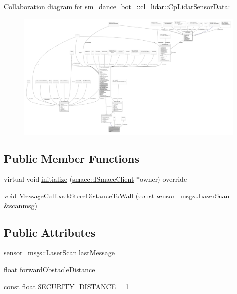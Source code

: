 Collaboration diagram for sm\+\_\+dance\+\_\+bot\+\_\+:\+:cl\+\_\+lidar\+:\+:Cp\+Lidar\+Sensor\+Data\+:
\nopagebreak
\begin{figure}[H]
\begin{center}
\leavevmode
\includegraphics[width=350pt]{classsm__dance__bot__2_1_1cl__lidar_1_1CpLidarSensorData__coll__graph}
\end{center}
\end{figure}
\subsection*{Public Member Functions}
\begin{DoxyCompactItemize}
\item 
virtual void \hyperlink{classsm__dance__bot__2_1_1cl__lidar_1_1CpLidarSensorData_a9b351aa0e6765dbfd4f9d71c2e8ba9a4}{initialize} (\hyperlink{classsmacc_1_1ISmaccClient}{smacc\+::\+I\+Smacc\+Client} $\ast$owner) override
\item 
void \hyperlink{classsm__dance__bot__2_1_1cl__lidar_1_1CpLidarSensorData_a90407d8b71f7168afac52713d4ea0b62}{Message\+Callback\+Store\+Distance\+To\+Wall} (const sensor\+\_\+msgs\+::\+Laser\+Scan \&scanmsg)
\end{DoxyCompactItemize}
\subsection*{Public Attributes}
\begin{DoxyCompactItemize}
\item 
sensor\+\_\+msgs\+::\+Laser\+Scan \hyperlink{classsm__dance__bot__2_1_1cl__lidar_1_1CpLidarSensorData_a877b88ea370b93b61a30816615e33d04}{last\+Message\+\_\+}
\item 
float \hyperlink{classsm__dance__bot__2_1_1cl__lidar_1_1CpLidarSensorData_a90d3f709388392afcb30ff988c1bcb50}{forward\+Obstacle\+Distance}
\item 
const float \hyperlink{classsm__dance__bot__2_1_1cl__lidar_1_1CpLidarSensorData_aa91ab36fbbd8a0f359d055a33ee89fa4}{S\+E\+C\+U\+R\+I\+T\+Y\+\_\+\+D\+I\+S\+T\+A\+N\+CE} = 1
\end{DoxyCompactItemize}
